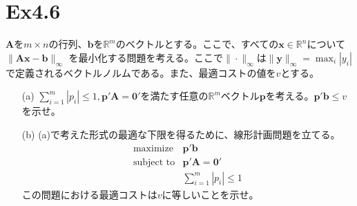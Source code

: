 \documentclass{jsarticle}
\begin{document}
\newpage
\section*{Ex4.6}
$\bm{A}$を$m\times n$の行列、$\bm{b}$を$\mathbb{R}^m$のベクトルとする。ここで、すべての$\bm{x}\in \mathbb{R}^n$について$\|\bm{Ax}-\bm{b}\|_\infty$
を最小化する問題を考える。ここで$\|\cdot \|_\infty$は$\|\bm{y}\|_\infty=\max_i|y_i|$で定義されるベクトルノルムである。また、最適コストの値を$v$とする。
\begin{itemize}
  \item[(a)] $\sum^m_{i=1}|p_i|\leq 1,\bm{p}'\bm{A}=\bm{0}'$を満たす任意の$\mathbb{R}^m$ベクトル$\bm{p}$を考える。$\bm{p}'\bm{b}\leq v$を示せ。
  \item[(b)] (a)で考えた形式の最適な下限を得るために、線形計画問題を立てる。
  \begin{equation*}
    \begin{array}{cc}
      \text{maximize} & \bm{p}'\bm{b}\\
      \text{subject to} & \bm{p}'\bm{A}=\bm{0}'\\
      & \sum^m_{i=1}|p_i| \leq 1
    \end{array}
  \end{equation*}
  この問題における最適コストは$v$に等しいことを示せ。
\end{itemize}
 \par
\end{document}
